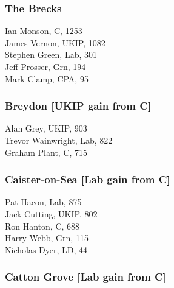 \documentclass[a4paper,openany,10pt]{book}
\begin{document}
\subsubsection*{The Brecks}



Ian Monson, C, 1253\\
James Vernon, UKIP, 1082\\
Stephen Green, Lab, 301\\
Jeff Prosser, Grn, 194\\
Mark Clamp, CPA, 95\\


\subsubsection*{Breydon \hspace*{\fill}\nolinebreak[1]%
\enspace\hspace*{\fill}
[UKIP gain from C]}



Alan Grey, UKIP, 903\\
Trevor Wainwright, Lab, 822\\
Graham Plant, C, 715\\


\subsubsection*{Caister-on-Sea \hspace*{\fill}\nolinebreak[1]%
\enspace\hspace*{\fill}
[Lab gain from C]}



Pat Hacon, Lab, 875\\
Jack Cutting, UKIP, 802\\
Ron Hanton, C, 688\\
Harry Webb, Grn, 115\\
Nicholas Dyer, LD, 44\\


\subsubsection*{Catton Grove \hspace*{\fill}\nolinebreak[1]%
\enspace\hspace*{\fill}
[Lab gain from C]}
\end{document}
